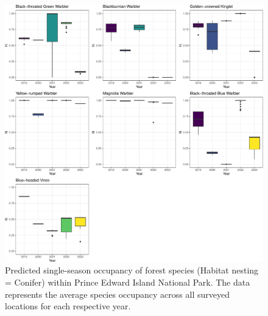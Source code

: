 \documentclass[
  letterpaper,
  DIV=11,
  numbers=noendperiod,
  oneside]{scrartcl}
\begin{document}
\begin{figure}

{\centering \includegraphics{peinp_files/figure-pdf/fig-spp-occ-conifer-1.pdf}

}

\caption{\label{fig-spp-occ-conifer}Predicted single-season occupancy of
forest species (Habitat nesting = Conifer) within Prince Edward Island
National Park. The data represents the average species occupancy across
all surveyed locations for each respective year.}

\end{figure}
\end{document}
